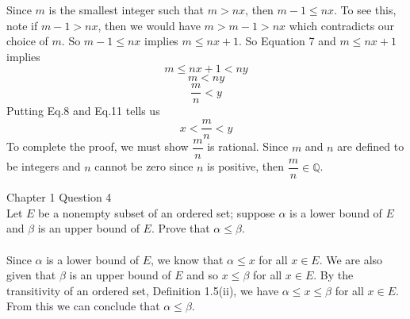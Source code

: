 \documentclass[12pt]{article}
\begin{document}
Since $m$ is the smallest integer such that $m>nx$, then $m-1 \leq nx$. To see this, note if $m-1 > nx$, then we would have $m> m-1 > nx$ which contradicts our choice of $m$. So $m-1 \leq nx$ implies $m \leq nx+1$. So Equation 7 and $m \leq nx+1$ implies
\begin{equation}
m \leq nx+1 < ny 
\end{equation}
\begin{equation}
m < ny 
\end{equation}
\begin{equation}
\dfrac{m}{n} < y
\end{equation}
Putting Eq.8 and Eq.11 tells us
\begin{equation}
x < \dfrac{m}{n} < y 
\end{equation}
To complete the proof, we must show $\dfrac{m}{n}$ is rational. Since $m$ and $n$ are defined to be integers and $n$ cannot be zero since $n$ is positive, then $\dfrac{m}{n} \in \mathbb{Q}$.

\problem Chapter 1 Question 4 \\

Let $E$ be a nonempty subset of an ordered set; suppose $\alpha$ is a lower bound of $E$ and $\beta$ is an upper bound of $E$. Prove that $ \alpha \leq \beta$. \\ \\
Since $\alpha$ is a lower bound of $E$, we know that $\alpha \leq x$ for all $x \in E$. We are also given that $\beta$ is an upper bound of $E$ and so $x \leq \beta$ for all $x \in E$. By the transitivity of an ordered set, Definition 1.5(ii), we have $\alpha \leq x \leq \beta$ for all $x \in E$. From this we can conclude that  $ \alpha \leq \beta$.
\end{document}
